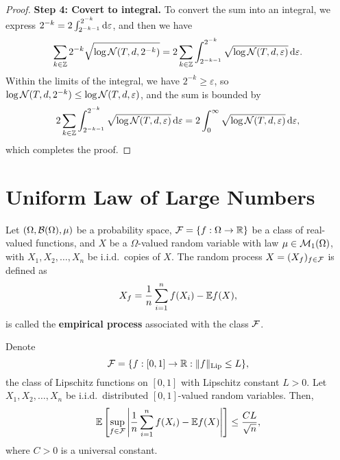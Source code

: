 \begin{proof}

	\textbf{Step 4: Covert to integral.} To convert the sum into an integral, we express \(2^{-k}=2\int_{2^{-k-1}}^{2^{-k}}\mathop{}\!\mathrm{d}\varepsilon\), and then we have
	\begin{equation*}
		\sum_{k\in\mathbb{Z}}2^{-k}\sqrt{\log\mathcal{N}(T,d,2^{-k})}=2\sum_{k\in\mathbb{Z}}\int_{2^{-k-1}}^{2^{-k}}\sqrt{\log\mathcal{N}(T,d,\varepsilon)}\mathop{}\!\mathrm{d}\varepsilon.
	\end{equation*}
	Within the limits of the integral, we have \(2^{-k}\geq\varepsilon\), so \(\log\mathcal{N}(T,d,2^{-k})\leq\log\mathcal{N}(T,d,\varepsilon)\), and the sum is bounded by
	\begin{equation*}
		2\sum_{k\in\mathbb{Z}}\int_{2^{-k-1}}^{2^{-k}}\sqrt{\log\mathcal{N}(T,d,\varepsilon)}\mathop{}\!\mathrm{d}\varepsilon=2\int_{0}^{\infty}\sqrt{\log\mathcal{N}(T,d,\varepsilon)}\mathop{}\!\mathrm{d}\varepsilon,
	\end{equation*}
	which completes the proof.
\end{proof}

\section{Uniform Law of Large Numbers}

\begin{definition}\label{def:empirical-process}
	Let \((\Omega,\mathcal{B}(\Omega),\mu)\) be a probability space, \(\mathcal{F}=\{f:\Omega\to\mathbb{R}\}\) be a class of real-valued functions, and \(X\) be a \(\Omega\)-valued random variable with law \(\mu\in\mathcal{M}_{1}(\Omega)\), with \(X_{1},X_{2},\ldots,X_{n}\) be i.i.d.\ copies of \(X\). The random process \(X=(X_{f})_{f\in\mathcal{F}}\) is defined as
	\begin{equation*}
		X_{f}=\frac{1}{n}\sum_{i=1}^{n}f(X_{i})-\mathbb{E} f(X),
	\end{equation*}
	is called the \textbf{empirical process} associated with the class \(\mathcal{F}\).
\end{definition}

\begin{theorem}
	Denote
	\begin{equation*}
		\mathcal{F}=\{f:[0,1]\to\mathbb{R}:\|f\|_{\text{Lip}}\leq L\},
	\end{equation*}
	the class of Lipschitz functions on \([0,1]\) with Lipschitz constant \(L>0\). Let \(X_{1},X_{2},\ldots,X_{n}\) be i.i.d.\ distributed \([0,1]\)-valued random variables. Then,
	\begin{equation*}
		\mathbb{E}\left[\sup_{f\in\mathcal{F}}\left|\frac{1}{n}\sum_{i=1}^{n}f(X_{i})-\mathbb{E} f(X)\right|\right]\leq\frac{CL}{\sqrt{n}},
	\end{equation*}
	where \(C>0\) is a universal constant.
\end{theorem}

